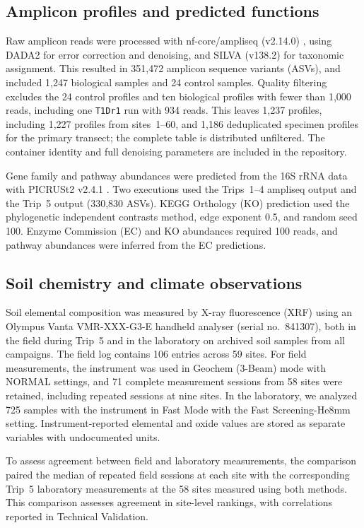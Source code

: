 \begin{revision}
\subsection{Amplicon profiles and predicted functions}
Raw amplicon reads were processed with nf-core/ampliseq (v2.14.0)
\cite{nfcore, ampliseq}, using DADA2 \cite{dada2} for error
correction and denoising, and SILVA (v138.2) \cite{silva} for taxonomic assignment. This resulted in 351,472 amplicon sequence variants (ASVs), and included 1,247 biological samples and 24 control samples. Quality filtering excludes the 24 control profiles and ten biological profiles with fewer than 1,000 reads, including one \texttt{T1Dr1} run with 934 reads. This leaves 1,237 profiles, including 1,227 profiles from sites~1--60, and 1,186 deduplicated specimen profiles for the primary transect; the complete table is distributed unfiltered. The container identity and full denoising parameters are included in the repository.

Gene family and pathway abundances were predicted from the 16S rRNA data with PICRUSt2 v2.4.1 \cite{picrust2}. Two executions used the Trips~1--4 ampliseq output and the Trip~5 output (330,830 ASVs). KEGG Orthology (KO) prediction used the phylogenetic independent contrasts method, edge exponent 0.5, and random seed 100. Enzyme Commission (EC) and KO abundances required 100 reads, and pathway abundances were inferred from the EC predictions.

\subsection{Soil chemistry and climate observations}\label{methods:xrf}
Soil elemental composition was measured by X-ray fluorescence (XRF) using an Olympus Vanta VMR-XXX-G3-E handheld analyser (serial no.\ 841307), both in the field during Trip~5 and in the laboratory on archived soil samples from all campaigns. The field log contains 106 entries across 59 sites. For field measurements, the instrument was used in Geochem (3-Beam) mode with NORMAL settings, and 71 complete measurement sessions from 58 sites were retained, including repeated sessions at nine sites. In the laboratory, we analyzed 725 samples with the instrument in Fast Mode with the Fast Screening-He8mm setting. Instrument-reported elemental and oxide values are stored as separate variables with undocumented units.

To assess agreement between field and laboratory measurements, the comparison paired the median of repeated field sessions at each site with the corresponding Trip~5 laboratory measurements at the 58 sites measured using both methods. This comparison assesses agreement in site-level rankings, with correlations reported in Technical Validation.


\end{revision}
